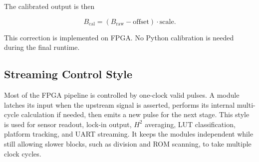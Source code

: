 The calibrated output is then

\begin{equation}
    B_{\mathrm{cal}} = (B_{\mathrm{raw}} - \mathrm{offset}) \cdot \mathrm{scale}.
\end{equation}

This correction is implemented on FPGA. No Python calibration is needed during the final runtime.

\subsection{Streaming Control Style}

Most of the FPGA pipeline is controlled by one-clock valid pulses. A module latches its input when the upstream  signal is asserted, performs its internal multi-cycle calculation if needed, then emits a new  pulse for the next stage. This style is used for sensor readout, lock-in output, $H^2$ averaging, LUT classification, platform tracking, and UART streaming. It keeps the modules independent while still allowing slower blocks, such as division and ROM scanning, to take multiple clock cycles.

